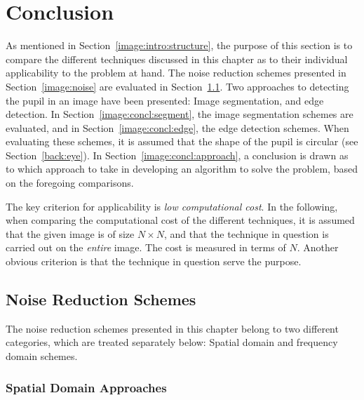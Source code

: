 
\section{Conclusion}
\label{image:concl}

As mentioned in Section~\ref{image:intro:structure}, the purpose of
this section is to compare the different techniques discussed in this
chapter as to their individual applicability to the problem at hand.
The noise reduction schemes presented in Section~\ref{image:noise} are
evaluated in Section~\ref{image:concl:noise}.  Two approaches to
detecting the pupil in an image have been presented: Image
segmentation, and edge detection.  In
Section~\ref{image:concl:segment}, the image segmentation schemes are
evaluated, and in Section~\ref{image:concl:edge}, the edge detection
schemes.  When evaluating these schemes, it is assumed that the shape
of the pupil is circular (see Section~\ref{back:eye}).  In
Section~\ref{image:concl:approach}, a conclusion is drawn as to which
approach to take in developing an algorithm to solve the problem,
based on the foregoing comparisons.

The key criterion for applicability is {\em low computational cost\/}.
In the following, when comparing the computational cost of the
different techniques, it is assumed that the given image is of size
$N\times N$, and that the technique in question is carried out on the
{\em entire\/} image.  The cost is measured in terms of $N$.  Another
obvious criterion is that the technique in question serve the purpose.

\subsection{Noise Reduction Schemes}
\label{image:concl:noise}

The noise reduction schemes presented in this chapter belong to two
different categories, which are treated separately below: Spatial
domain and frequency domain schemes.

\subsubsection{Spatial Domain Approaches}

